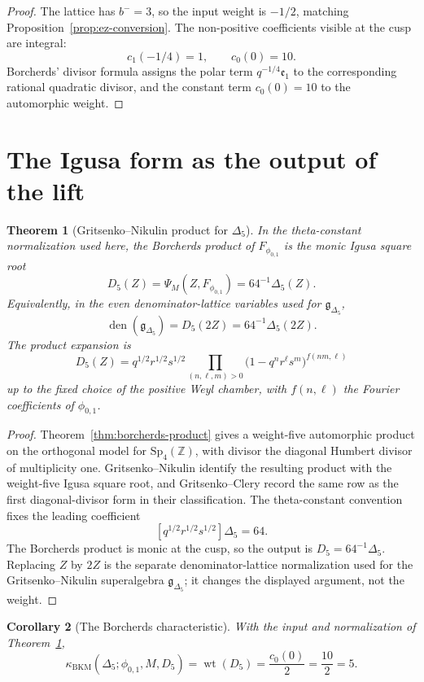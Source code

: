 \documentclass[11pt]{amsart}
\newtheorem{theorem}{Theorem}[section]
\newtheorem{corollary}[theorem]{Corollary}
\newcommand{\kBKM}{\kappa_{\mathrm{BKM}}}
\newcommand{\ZZ}{\mathbb{Z}}
\newcommand{\Sp}{\mathrm{Sp}}
\newcommand{\gDelta}{\mathfrak{g}_{\Delta_5}}
\newcommand{\phij}{\phi_{0,1}}
\newcommand{\Delfive}{\Delta_5}
\newcommand{\wt}{\operatorname{wt}}
\begin{document}
\begin{proof}
The lattice has \(b^-=3\), so the input weight is \(-1/2\), matching
Proposition~\ref{prop:ez-conversion}.  The non-positive coefficients
visible at the cusp are integral:
\[
 c_1(-1/4)=1,\qquad c_0(0)=10.
\]
Borcherds' divisor formula assigns the polar term \(q^{-1/4}
\mathfrak e_1\) to the corresponding rational quadratic divisor, and
the constant term \(c_0(0)=10\) to the automorphic weight.
\end{proof}

\section{The Igusa form as the output of the lift}

\begin{theorem}[Gritsenko--Nikulin product for \(\Delfive\)]
\label{thm:delta5-output}
In the theta-constant normalization used here, the Borcherds product
of \(F_{\phij}\) is the monic Igusa square root
\[
 D_5(Z)=\Psi_M(Z,F_{\phij})=64^{-1}\Delfive(Z).
\]
Equivalently, in the even denominator-lattice variables used for
\(\gDelta\),
\[
 \operatorname{den}(\gDelta)=D_5(2Z)=64^{-1}\Delfive(2Z).
\]
The product expansion is
\[
 D_5(Z)
 =q^{1/2}r^{1/2}s^{1/2}
 \prod_{(n,\ell,m)>0}
 \bigl(1-q^n r^\ell s^m\bigr)^{f(nm,\ell)}
\]
up to the fixed choice of the positive Weyl chamber, with
\(f(n,\ell)\) the Fourier coefficients of \(\phij\).
\end{theorem}

\begin{proof}
Theorem~\ref{thm:borcherds-product} gives a weight-five automorphic
product on the orthogonal model for \(\Sp_4(\ZZ)\), with divisor
the diagonal Humbert divisor of multiplicity one.  Gritsenko--Nikulin
identify the resulting product with the weight-five Igusa square root,
and Gritsenko--Clery record the same row as the first diagonal-divisor
form in their classification.  The theta-constant convention fixes
the leading coefficient
\[
 [q^{1/2}r^{1/2}s^{1/2}]\Delfive=64.
\]
The Borcherds product is monic at the cusp, so the output is
\(D_5=64^{-1}\Delfive\).  Replacing \(Z\) by \(2Z\) is the separate
denominator-lattice normalization used for the Gritsenko--Nikulin
superalgebra \(\gDelta\); it changes the displayed argument, not the
weight.
\end{proof}

\begin{corollary}[The Borcherds characteristic]
\label{cor:kBKM-delta5}
With the input and normalization of Theorem~\ref{thm:delta5-output},
\[
 \kBKM(\Delfive;\phij,M,D_5)
 =\wt(D_5)
 =\frac{c_0(0)}{2}
 =\frac{10}{2}
 =5.
\]
\end{corollary}
\end{document}
